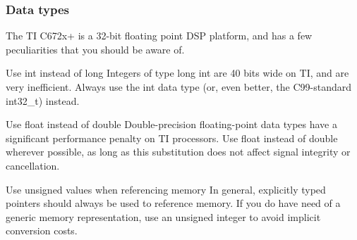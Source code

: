 \hypertarget{a00832_subsection__data_types}{}\subsubsection{Data types}\label{a00832_subsection__data_types}
The TI C672x+ is a 32-\/bit floating point D\+SP platform, and has a few peculiarities that you should be aware of.


\begin{DoxyItemize}
\item Use {\ttfamily int} instead of {\ttfamily long}  Integers of type {\ttfamily long int} are 40 bits wide on TI, and are very inefficient. Always use the {\ttfamily int} data type (or, even better, the C99-\/standard {\ttfamily int32\+\_\+t}) instead.  


\item Use {\ttfamily float} instead of {\ttfamily double}  Double-\/precision floating-\/point data types have a significant performance penalty on TI processors. Use {\ttfamily float} instead of {\ttfamily double} wherever possible, as long as this substitution does not affect signal integrity or cancellation.  


\item Use unsigned values when referencing memory  In general, explicitly typed pointers should always be used to reference memory. If you do have need of a generic memory representation, use an unsigned integer to avoid implicit conversion costs.  


\end{DoxyItemize}


